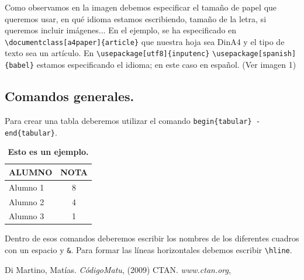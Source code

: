 \documentclass[a4paper]{article}
\begin{document}
Como observamos en la imagen debemos especificar el tamaño de papel que queremos usar, en qué idioma estamos escribiendo, tamaño de la letra, si queremos incluir imágenes... En el ejemplo, se ha especificado en \verb|\documentclass[a4paper]{article}| que nuestra hoja sea DinA4 y el tipo de texto sea un artículo. En \verb|\usepackage[utf8]{inputenc}|
\verb|\usepackage[spanish]{babel}| estamos especificando el idioma; en este caso en espa\~nol. (Ver imagen 1)

	\subsection{Comandos generales.}
	Para crear una tabla deberemos utilizar el comando \verb|begin{tabular} - end{tabular}|.
\begin{table}
\begin{tabular}{|l|c|}
\hline
ALUMNO & NOTA \\ \hline
Alumno 1 & 8 \\ \hline
Alumno 2 & 4 \\ \hline
Alumno 3 & 1 \\ \hline
\end{tabular}
\caption{\textbf{Esto es un ejemplo.}}
\end{table}
	Dentro de esos comandos deberemos escribir los nombres de los diferentes cuadros con un espacio y \verb|&|. Para formar las líneas horizontales debemos escribir \verb|\hline|.

\begin{thebibliography}{00}
		Di Martino, Matías.
		\emph{CódigoMatu},
		(2009)
		CTAN.
		\emph{www.ctan.org},
\end{thebibliography}
\end{document}
